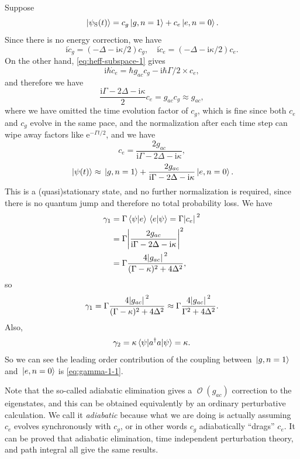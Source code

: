 \documentclass[hyperref, a4paper]{article}
\newcommand*{\ii}{\mathrm{i}}
\newcommand*{\ee}{\mathrm{e}}
\DeclareMathOperator{\bigO}{\mathcal{O}}
\begin{document}
\begin{itemize}
Suppose 
\[
    \ket*{\psi_\text{S}(t)} = c_g \ket*{g, n=1} + c_e \ket*{e, n=0}.
\]
Since there is no energy correction, we have 
\[
    \ii \dot{c}_g = (- \Delta - \ii \kappa / 2) c_g, \quad \ii \dot{c}_e = (- \Delta - \ii \kappa / 2) c_e.
\]
On the other hand, \eqref{eq:heff-subspace-1} gives 
\[
    \ii \hbar \dot{c}_e = \hbar g_{ac} c_g - \ii \hbar \Gamma / 2 \times c_e,
\]
and therefore we have 
\[
    \frac{\ii \Gamma - 2 \Delta - \ii \kappa}{2 } c_e = g_{ac} c_g \approx g_{ac},
\]
where we have omitted the time evolution factor of $c_g$, which is fine since both $c_e$ and $c_g$ evolve in 
the same pace, and the normalization after each time step can wipe away factors like $\ee^{- \Gamma t / 2}$,
and we have 
\[
    c_e = \frac{2 g_{ac}}{\ii \Gamma - 2 \Delta - \ii \kappa},
\]
\begin{equation}
    \ket*{\psi(t)} \approx \ket*{g, n=1} + \frac{2 g_{ac}}{\ii \Gamma - 2 \Delta - \ii \kappa} \ket*{e, n=0}.
\end{equation}
This is a (quasi)stationary state, and no further normalization is required, since there is no quantum jump 
and therefore no total probability loss. We have 
\[
    \begin{aligned}
        \gamma_1 &= \Gamma \braket*{\psi}{e} \braket*{e}{\psi} = \Gamma \abs*{c_e}^2 \\
        &= \Gamma \abs{\frac{2 g_{ac}}{\ii \Gamma - 2 \Delta - \ii \kappa}}^2 \\
        &= \Gamma \frac{4 \abs*{g_{ac}}^2}{(\Gamma - \kappa)^2 + 4 \Delta^2 },
    \end{aligned}
\]
so
\begin{equation}
    \gamma_1 = \Gamma \frac{4 \abs*{g_{ac}}^2}{(\Gamma - \kappa)^2 + 4 \Delta^2 } \approx \Gamma \frac{4 \abs*{g_{ac}}^2}{\Gamma^2 + 4 \Delta^2 }.
    \label{eq:gamma-1-1}
\end{equation}
Also, 
\begin{equation}
    \gamma_2 = \kappa \expval{a^\dagger a}{\psi} = \kappa.
    \label{eq:gamma-2-1}
\end{equation}
So we can see the leading order contribution of the coupling between $\ket*{g, n=1}$ and $\ket*{e, n=0}$ is 
\eqref{eq:gamma-1-1}.

\begin{note*}{}
    Note that the so-called adiabatic elimination gives a $\bigO(g_{ac})$ correction to the eigenstates,
    and this can be obtained equivalently by an ordinary perturbative calculation. We call it \emph{adiabatic}
    because what we are doing is actually assuming $c_e$ evolves synchronously with $c_g$, or in other words
    $c_{g}$ adiabatically ``drags'' $c_{e}$. 
    It can be proved that adiabatic elimination, time independent perturbation theory, and path integral 
    all give the same results.
\end{note*}


\end{itemize}
\end{document}
